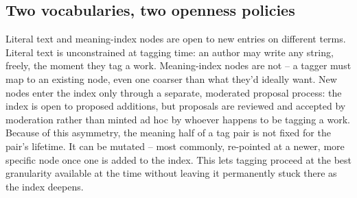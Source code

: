 \documentclass{amsart}
\theoremstyle{remark}
\begin{document}
    \subsection{Two vocabularies, two openness policies}
    Literal text and meaning-index nodes are open to new entries on different terms. Literal text is unconstrained at tagging time: an author may write any string, freely, the moment they tag a work. Meaning-index nodes are not -- a tagger must map to an existing node, even one coarser than what they'd ideally want. New nodes enter the index only through a separate, moderated proposal process: the index is open to proposed additions, but proposals are reviewed and accepted by moderation rather than minted ad hoc by whoever happens to be tagging a work.
    Because of this asymmetry, the meaning half of a tag pair is not fixed for the pair's lifetime. It can be mutated -- most commonly, re-pointed at a newer, more specific node once one is added to the index. This lets tagging proceed at the best granularity available at the time without leaving it permanently stuck there as the index deepens.
\end{document}
